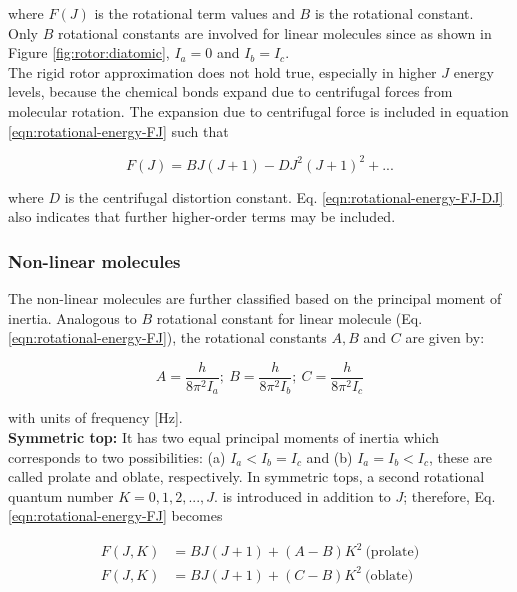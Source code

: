 where $F(J)$ is the rotational term values and $B$ is the rotational constant.\\
Only $B$ rotational constants are involved for linear molecules since as shown in Figure \ref{fig:rotor:diatomic}, $I_a=0$ and $I_b=I_c$.\\

The rigid rotor approximation does not hold true, especially in higher $J$ energy levels, because the chemical bonds expand due to centrifugal forces from molecular rotation. The expansion due to centrifugal force is included in equation \ref{eqn:rotational-energy-FJ} such that

\begin{equation}
    \label{eqn:rotational-energy-FJ-DJ}
    F(J) = BJ(J+1) -DJ^2(J+1)^2 + ...
\end{equation}

where $D$ is the centrifugal distortion constant. Eq. \ref{eqn:rotational-energy-FJ-DJ} also indicates that further higher-order terms may be included.

\subsubsection{Non-linear molecules}
\label{sec:mol-rotation:non-linear}
The non-linear molecules are further classified based on the principal moment of inertia. Analogous to $B$ rotational constant for linear molecule (Eq. \ref{eqn:rotational-energy-FJ}), the rotational constants $A, B$ and $C$ are given by:

\begin{equation}
    \label{eqn:rotational-constants}
    A=\frac{h}{8\pi^2 I_a};\ B=\frac{h}{8\pi^2 I_b};\ C=\frac{h}{8\pi^2 I_c}
\end{equation}

with units of frequency [Hz].\\

\textbf{Symmetric top: } It has two equal principal moments of inertia which corresponds to two possibilities: (a) $I_a < I_b = I_c$ and (b) $I_a = I_b < I_c$, these are called prolate and oblate, respectively. In symmetric tops, a second rotational quantum number $K=0, 1, 2, ..., J.$ is introduced in addition to $J$; therefore, Eq. \ref{eqn:rotational-energy-FJ} becomes

\begin{align}
    F(J, K) &= BJ(J+1) + (A-B)K^2\ \text{(prolate)} \label{eqn:rotational-energy-FJ-AKJ}\\
    F(J, K) &= BJ(J+1) + (C-B)K^2\ \text{(oblate)} \label{eqn:rotational-energy-FJ-CKJ}
\end{align}

